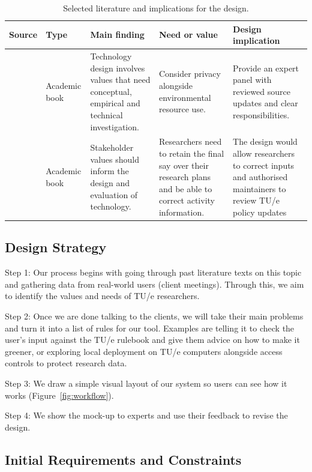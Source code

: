 \documentclass[11pt,a4paper]{article}
\begin{document}
\begin{table}[htbp]
\centering
\small
\begin{tabularx}{\textwidth}{@{}p{}p{}XXp{}@{}}
\toprule
Source & Type & Main finding & Need or value & Design implication \\
\midrule
\citet{friedman2019shaping}
& Academic book  
& Technology design involves values that need conceptual, empirical and technical investigation.
& Consider privacy alongside environmental resource use. 
& Provide an expert panel with reviewed source updates and clear responsibilities.  \\
\midrule
\citet{friedman2019shaping}
& Academic book
& Stakeholder values should inform the design and evaluation of technology. & Researchers need to retain the final say over their research plans and be able to correct activity information.
& The design would allow researchers to correct inputs and authorised maintainers to review TU/e policy updates \\
\bottomrule
\end{tabularx}
\caption{Selected literature and implications for the design.}
\label{tab:literature}

\end{table}

\FloatBarrier
\subsection{Design Strategy}

Step 1: Our process begins with going through past literature texts on this topic and gathering data from real-world users (client meetings). Through this, we aim to identify the values and needs of TU/e researchers.

Step 2: Once we are done talking to the clients, we will take their main problems and turn it into a list of rules for our tool. Examples are telling it to check the user's input against the TU/e rulebook and give them advice on how to make it greener, or exploring local deployment on TU/e computers alongside access controls to protect research data.

Step 3: We draw a simple visual layout of our system so users can see how it works (Figure~\ref{fig:workflow}).

Step 4: We show the mock-up to experts and use their feedback to revise the design.


\FloatBarrier
\subsection{Initial Requirements and Constraints}
\end{document}
